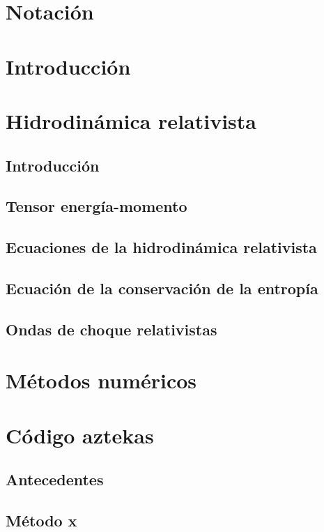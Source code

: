 \documentclass[letterpaper,12pt,oneside]{book}
\begin{document}
\chapter{Notación}

\chapter{Introducción}

\tableofcontents
\listoffigures

    
\mainmatter

\chapter{Hidrodinámica relativista} \section{Introducción}
    \section{Tensor energía-momento}
    \section{Ecuaciones de la hidrodinámica relativista}
    \section{Ecuación de la conservación de la entropía}
    \section{Ondas de choque relativistas}

\chapter{Métodos numéricos}

\chapter{Código aztekas}
    \section{Antecedentes}
    \section{Método x}
\end{document}
